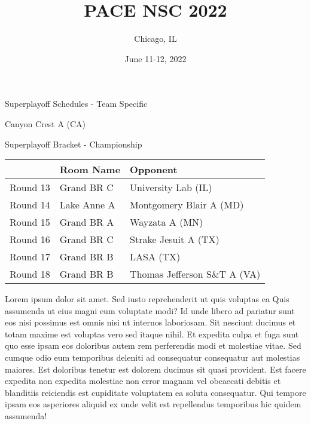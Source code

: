 \documentclass{article}%
\title{PACE NSC 2022}%
\author{Chicago, IL}%
\date{June 11{-}12, 2022}%
\begin{document}
%
\normalsize%
%
\maketitle%
\vspace*{48pt}%
\begin{center}%
\begin{Huge}%
Superplayoff Schedules {-} Team Specific%
\end{Huge}%
\end{center}%
\newpage%
\begin{center}%
\begin{Huge}%
Canyon Crest A (CA)%
\end{Huge}%
\vspace*{8pt}%
\linebreak%
\begin{Large}%
Superplayoff Bracket {-} Championship%
\end{Large}%
\end{center}%
%
\begin{tabularx}{\textwidth}{|c|Y|Y|}%
\hline%
&Room Name&Opponent\\%
\hline%
Round 13&Grand BR C&University Lab (IL)\\%
Round 14&Lake Anne A&Montgomery Blair A (MD)\\%
Round 15&Grand BR A&Wayzata A (MN)\\%
Round 16&Grand BR C&Strake Jesuit A (TX)\\%
Round 17&Grand BR B&LASA (TX)\\%
Round 18&Grand BR B&Thomas Jefferson S\&T A (VA)\\%
\hline%
\end{tabularx}%
\vspace*{8pt}%
\linebreak%
\newline%
\newline%
Lorem ipsum dolor sit amet. Sed iusto reprehenderit ut quis voluptas ea Quis assumenda ut eius magni eum voluptate modi? Id unde libero ad pariatur sunt eos nisi possimus est omnis nisi ut internos laboriosam. Sit nesciunt ducimus et totam maxime est voluptas vero sed itaque nihil. Et expedita culpa et fuga sunt quo esse ipsam eos doloribus autem rem perferendis modi et molestiae vitae.\newline%
\newline%
Sed cumque odio eum temporibus deleniti ad consequatur consequatur aut molestias maiores. Est doloribus tenetur est dolorem ducimus sit quasi provident. Est facere expedita non expedita molestiae non error magnam vel obcaecati debitis et blanditiis reiciendis est cupiditate voluptatem ea soluta consequatur. Qui tempore ipsam eos asperiores aliquid ex unde velit est repellendus temporibus hic quidem assumenda!\newline%
\end{document}
